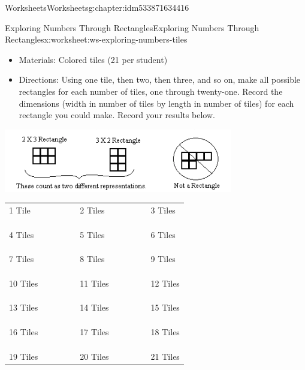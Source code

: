 \documentclass[twoside,11pt,]{book}
\begin{document}
\begin{chapterptx}{Worksheets}{}{Worksheets}{}{}{g:chapter:idm533871634416}
\begin{worksheet-section-numberless}{Exploring Numbers Through Rectangles}{}{Exploring Numbers Through Rectangles}{}{}{x:worksheet:ws-exploring-numbers-tiles}
\begin{introduction}{}%
%
\begin{itemize}[label=\textbullet]
\item{}Materials:  Colored tiles (21 per student)%
\item{}Directions: Using one tile, then two, then three, and so on, make all possible rectangles for each number of tiles, one through twenty-one. Record the dimensions (width in number of tiles by length in number of tiles) for each rectangle you could make. Record your results below.%
\end{itemize}
%
\begin{sidebyside}{1}{0.15}{0.15}{0}%
\begin{sbspanel}{0.7}%
\includegraphics[width=1\linewidth]{images/number-tiles.png}
\end{sbspanel}%
\end{sidebyside}%
\begin{sidebyside}{1}{0}{0}{0}%
\begin{sbspanel}{1}%
{\centering%
\begin{tabular}{lllllllllll}
1 Tile&&&&&2 Tiles&&&&&3 Tiles\tabularnewline[0pt]
&&&&&&&&&&\tabularnewline[0pt]
&&&&&&&&&&\tabularnewline[0pt]
&&&&&&&&&&\tabularnewline[0pt]
4 Tiles&&&&&5 Tiles&&&&&6 Tiles\tabularnewline[0pt]
&&&&&&&&&&\tabularnewline[0pt]
&&&&&&&&&&\tabularnewline[0pt]
&&&&&&&&&&\tabularnewline[0pt]
7 Tiles&&&&&8 Tiles&&&&&9 Tiles\tabularnewline[0pt]
&&&&&&&&&&\tabularnewline[0pt]
&&&&&&&&&&\tabularnewline[0pt]
&&&&&&&&&&\tabularnewline[0pt]
10 Tiles&&&&&11 Tiles&&&&&12 Tiles\tabularnewline[0pt]
&&&&&&&&&&\tabularnewline[0pt]
&&&&&&&&&&\tabularnewline[0pt]
&&&&&&&&&&\tabularnewline[0pt]
13 Tiles&&&&&14 Tiles&&&&&15 Tiles\tabularnewline[0pt]
&&&&&&&&&&\tabularnewline[0pt]
&&&&&&&&&&\tabularnewline[0pt]
&&&&&&&&&&\tabularnewline[0pt]
16 Tiles&&&&&17 Tiles&&&&&18 Tiles\tabularnewline[0pt]
&&&&&&&&&&\tabularnewline[0pt]
&&&&&&&&&&\tabularnewline[0pt]
&&&&&&&&&&\tabularnewline[0pt]
19 Tiles&&&&&20 Tiles&&&&&21 Tiles
\end{tabular}
\par}

\end{sbspanel}
\end{sidebyside}
\end{introduction}
\end{worksheet-section-numberless}
\end{chapterptx}
\end{document}
